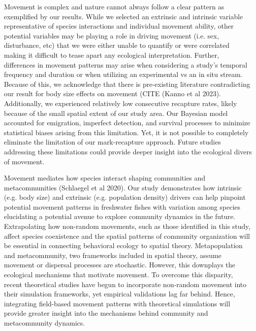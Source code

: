 \documentclass[11pt, class=article, crop=false]{standalone}
\begin{document}
Movement is complex and nature cannot always follow a clear pattern as exemplified by our results. While we selected an extrinsic and intrinsic variable representative of species interactions and individual movement ability, other potential variables may be playing a role in driving movement (i.e. sex, disturbance, etc) that we were either unable to quantify or were correlated making it difficult to tease apart any ecological interpretation. Further, differences in movement patterns may arise when considering a study’s temporal frequency and duration or when utilizing an experimental vs an in situ stream. Because of this, we acknowledge that there is pre-existing literature contradicting our result for body size effects on movement (CITE (Kanno et al 2023). Additionally, we experienced relatively low consecutive recapture rates, likely because of the small spatial extent of our study area. Our Bayesian model accounted for emigration, imperfect detection, and survival processes to minimize statistical biases arising from this limitation. Yet, it is not possible to completely eliminate the limitation of our mark-recapture approach. Future studies addressing these limitations could provide deeper insight into the ecological divers of movement.

Movement mediates how species interact shaping communities and metacommunities (Schlaegel et al 2020). Our study demonstrates how intrinsic (e.g. body size) and extrinsic (e.g. population density) drivers can help pinpoint potential movement patterns in freshwater fishes with variation among species elucidating a potential avenue to explore community dynamics in the future. Extrapolating how non-random movements, such as those identified in this study, affect species coexistence and the spatial patterns of community organization will be essential in connecting behavioral ecology to spatial theory. Metapopulation and metacommunity, two frameworks included in spatial theory, assume movement or dispersal processes are stochastic. However, this downplays the ecological mechanisms that motivate movement. To overcome this disparity, recent theoretical studies have begun to incorporate non-random movement into their simulation frameworks, yet empirical validations lag far behind. Hence, integrating field-based movement patterns with theoretical simulations will provide greater insight into the mechanisms behind community and metacommunity dynamics.
\end{document}
